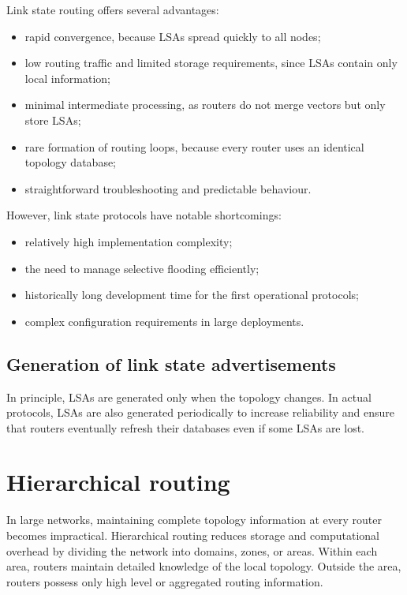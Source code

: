 Link state routing offers several advantages:

\begin{itemize}
\item rapid convergence, because LSAs spread quickly to all nodes;
\item low routing traffic and limited storage requirements, since LSAs contain only local information;
\item minimal intermediate processing, as routers do not merge vectors but only store LSAs;
\item rare formation of routing loops, because every router uses an identical topology database;
\item straightforward troubleshooting and predictable behaviour.
\end{itemize}

However, link state protocols have notable shortcomings:

\begin{itemize}
\item relatively high implementation complexity;
\item the need to manage selective flooding efficiently;
\item historically long development time for the first operational protocols;
\item complex configuration requirements in large deployments.
\end{itemize}

\subsection{Generation of link state advertisements}

In principle, LSAs are generated only when the topology changes. In actual protocols, LSAs are also generated periodically to increase reliability and ensure that routers eventually refresh their databases even if some LSAs are lost.




\section{Hierarchical routing}

In large networks, maintaining complete topology information at every router becomes impractical. Hierarchical routing reduces storage and computational overhead by dividing the network into domains, zones, or areas. Within each area, routers maintain detailed knowledge of the local topology. Outside the area, routers possess only high level or aggregated routing information.

